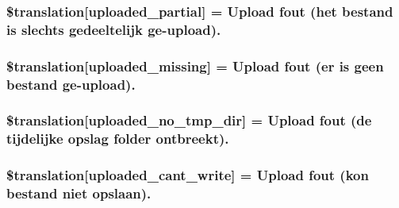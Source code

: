 \subsubsection[{\$translation}]{\setlength{\rightskip}{0pt plus 5cm}\$translation\mbox{[}\textquotesingle{}uploaded\+\_\+partial\textquotesingle{}\mbox{]} = \textquotesingle{}Upload fout (het bestand is slechts gedeeltelijk ge-\/{\bf upload}).\textquotesingle{}}\label{class_8upload_8nl___n_l_8php_a967c17da21b0a2d3bd65cca3a9ca0ea8}
\hypertarget{class_8upload_8nl___n_l_8php_a0cce433260be65f1f35853a6b4b8952b}{}
\subsubsection[{\$translation}]{\setlength{\rightskip}{0pt plus 5cm}\$translation\mbox{[}\textquotesingle{}uploaded\+\_\+missing\textquotesingle{}\mbox{]} = \textquotesingle{}Upload fout (er is geen bestand ge-\/{\bf upload}).\textquotesingle{}}\label{class_8upload_8nl___n_l_8php_a0cce433260be65f1f35853a6b4b8952b}
\hypertarget{class_8upload_8nl___n_l_8php_ae3cdc68fe248399f77246c91b0555341}{}
\subsubsection[{\$translation}]{\setlength{\rightskip}{0pt plus 5cm}\$translation\mbox{[}\textquotesingle{}uploaded\+\_\+no\+\_\+tmp\+\_\+dir\textquotesingle{}\mbox{]} = \textquotesingle{}Upload fout (de tijdelijke opslag folder ontbreekt).\textquotesingle{}}\label{class_8upload_8nl___n_l_8php_ae3cdc68fe248399f77246c91b0555341}
\hypertarget{class_8upload_8nl___n_l_8php_af368fee3b41bc05e6b208c1557a00c00}{}
\subsubsection[{\$translation}]{\setlength{\rightskip}{0pt plus 5cm}\$translation\mbox{[}\textquotesingle{}uploaded\+\_\+cant\+\_\+write\textquotesingle{}\mbox{]} = \textquotesingle{}Upload fout (kon bestand niet opslaan).\textquotesingle{}}\label{class_8upload_8nl___n_l_8php_af368fee3b41bc05e6b208c1557a00c00}
\hypertarget{class_8upload_8nl___n_l_8php_a01c69a4c8556602b3892dce727bace11}{}
